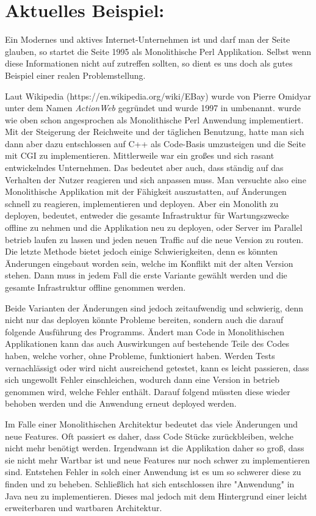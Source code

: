 \section{Aktuelles Beispiel: \ebay}
\label{sec:beispielEbay}
Ein Modernes und aktives Internet-Unternehmen ist \ebay und darf man der Seite \cite{highscalability} glauben, so startet die Seite 1995 als Monolithische Perl Applikation. Selbst wenn diese Informationen nicht auf \ebay zutreffen sollten, so dient es uns doch als gutes Beispiel einer realen Problemstellung.

Laut Wikipedia (https://en.wikipedia.org/wiki/EBay) wurde  von Pierre Omidyar unter dem Namen \textit{ActionWeb} gegründet und wurde 1997 in \ebay umbenannt. \ebay wurde wie oben schon angesprochen als Monolithische Perl Anwendung implementiert. Mit der Steigerung der Reichweite und der täglichen Benutzung, hatte man sich dann aber dazu entschlossen auf C++ als Code-Basis umzusteigen und die Seite mit CGI zu implementieren. Mittlerweile war \ebay ein großes und sich rasant entwickelndes Unternehmen. Das bedeutet aber auch, dass \ebay ständig auf das Verhalten der Nutzer reagieren und sich anpassen muss. Man versuchte also eine Monolithische Applikation mit der Fähigkeit auszustatten, auf Änderungen schnell zu reagieren, implementieren und deployen. Aber ein Monolith zu deployen, bedeutet, entweder die gesamte Infrastruktur für Wartungszwecke offline zu nehmen und die Applikation neu zu deployen, oder Server im Parallel betrieb laufen zu lassen und jeden neuen Traffic auf die neue Version zu routen. Die letzte Methode bietet jedoch einige Schwierigkeiten, denn es könnten Änderungen eingebaut worden sein, welche im Konflikt mit der alten Version stehen. Dann muss in jedem Fall die erste Variante gewählt werden und die gesamte Infrastruktur offline genommen werden.

Beide Varianten der Änderungen sind jedoch zeitaufwendig und  schwierig, denn nicht nur das deployen könnte Probleme bereiten, sondern auch die darauf folgende Ausführung des Programms. Ändert man Code in Monolithischen Applikationen kann das auch Auswirkungen auf bestehende Teile des Codes haben, welche vorher, ohne Probleme, funktioniert haben. Werden Tests vernachlässigt oder wird nicht ausreichend getestet, kann es leicht passieren, dass sich ungewollt Fehler einschleichen, wodurch dann eine Version in betrieb genommen wird, welche Fehler enthält. Darauf folgend müssten diese wieder behoben werden und die Anwendung erneut deployed werden.

Im Falle einer Monolithischen Architektur bedeutet das viele Änderungen und neue Features. Oft passiert es daher, dass Code Stücke zurückbleiben, welche nicht mehr benötigt werden. Irgendwann ist die Applikation daher so groß, dass sie nicht mehr Wartbar ist und neue Features nur noch schwer zu implementieren sind. Entstehen Fehler in solch einer Anwendung ist es um so schwerer diese zu finden und zu beheben. Schließlich hat sich \ebay entschlossen ihre "Anwendung" in Java neu zu implementieren. Dieses mal jedoch mit dem Hintergrund einer leicht erweiterbaren und wartbaren Architektur.

